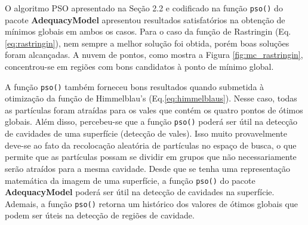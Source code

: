\documentclass[10pt,letterpaper]{article}
\begin{document}
O algoritmo PSO apresentado na Seção 2.2 e codificado na função \texttt{pso()} do pacote \textbf{AdequacyModel} apresentou resultados satisfatórios na obtenção de mínimos globais em ambos os casos. Para o caso da função de Rastringin (Eq. \ref{eq:rastringin}), nem sempre a melhor solução foi obtida, porém boas soluções foram alcançadas. A nuvem de pontos, como mostra a Figura \ref{fig:mc_rastringin}, concentrou-se em regiões com bons candidatos à ponto de mínimo global. 

A função \texttt{pso()} também forneceu bons resultados quando submetida à otimização da função de Himmelblau's (Eq.\ref{eq:himmelblaus}). Nesse caso, todas as partículas foram atraídas para os vales que contém os quatro pontos de ótimos globais. Além disso, percebeu-se que a função \texttt{pso()} poderá ser útil na detecção de cavidades de uma superfície  (detecção de vales). Isso muito provavelmente deve-se ao fato da recolocação aleatória de partículas no espaço de busca, o que permite que as partículas possam se dividir em grupos que não necessariamente serão atraídos para a mesma cavidade. Desde que se tenha uma representação matemática da imagem de uma superfície, a função \texttt{pso()} do pacote \textbf{AdequacyModel} poderá ser útil na detecção de cavidades na superfície. Ademais, a função \texttt{pso()} retorna um histórico dos valores de ótimos globais que podem ser úteis na detecção de regiões de cavidade.
\end{document}
